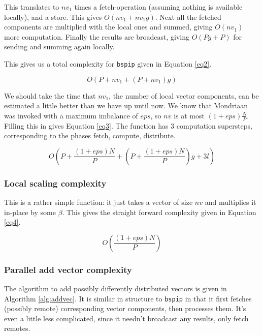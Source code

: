 \documentclass[a4paper]{article}
\begin{document}
This translates to $nv_1$ times a fetch-operation (assuming nothing is
available locally), and a store. This gives $O(nv_1 + nv_1 g)$. Next
all the fetched components are multiplied with the local ones and summed,
giving $O(nv_1)$ more computation. Finally the results are broadcast,
giving $O(P g + P)$ for sending and summing again locally.

This gives us a total complexity for \texttt{bspip} given in Equation \ref{eq2}.

\begin{equation}
    O(P + nv_1 + (P + nv_1) g)
    \label{eq2}
\end{equation}

We should take the time that $nv_1$, the number of local vector
components, can be estimated a little better than we have up until now.
We know that Mondriaan was invoked with a maximum imbalance of $eps$,
so $nv$ is at most $(1+eps)\frac{N}{P}$. Filling this in gives Equation \ref{eq3}. The function has 3 computation supersteps, corresponding to the phases fetch, compute, distribute.

\begin{equation}
    O(P + \frac{(1+eps)N}{P} + (P + \frac{(1+eps)N}{P}) g + 3l)
    \label{eq3}
\end{equation}

\subsubsection{Local scaling complexity}

This is a rather simple function: it just takes a vector of size
$nv$ and multiplies it in-place by some $\beta$. This gives the
straight forward complexity given in Equation \ref{eq4}.

\begin{equation}
    O( \frac{(1+eps)N}{P})
    \label{eq4}
\end{equation}

\subsubsection{Parallel add vector complexity}

The algorithm to add possibly differently distributed vectors
is given in Algorithm \ref{alg:addvec}. It is similar in structure to
\texttt{bspip} in that it first fetches (possibly remote) corresponding
vector components, then processes them. It's even a little less complicated,
since it needn't broadcast any results, only fetch remotes.
\end{document}
